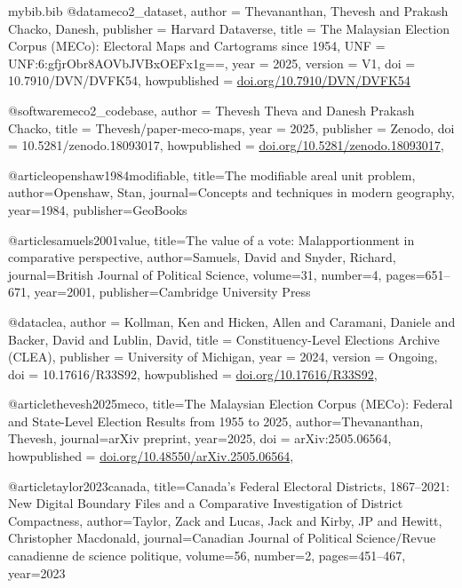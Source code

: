 \documentclass[11pt]{article}
\begin{document}
\begin{filecontents*}[overwrite]{mybib.bib}
	@data{meco2_dataset,
		author = {Thevananthan, Thevesh and Prakash Chacko, Danesh},
		publisher = {Harvard Dataverse},
		title = {{The Malaysian Election Corpus (MECo): Electoral Maps and Cartograms since 1954}},
		UNF = {UNF:6:gfjrObr8AOVbJVBxOEFx1g==},
		year = {2025},
		version = {V1},
		doi = {10.7910/DVN/DVFK54},
		howpublished = {\href{https://doi.org/10.7910/DVN/DVFK54}{doi.org/10.7910/DVN/DVFK54}}
	}

	@software{meco2_codebase,
		author       = {Thevesh Theva and Danesh Prakash Chacko},
		title        = {Thevesh/paper-meco-maps},
		year         = 2025,
		publisher    = {Zenodo},
		doi          = {10.5281/zenodo.18093017},
		howpublished = {\href{https://doi.org/10.5281/zenodo.18093017}{doi.org/10.5281/zenodo.18093017}},
	}

	@article{openshaw1984modifiable,
		title={The modifiable areal unit problem},
		author={Openshaw, Stan},
		journal={Concepts and techniques in modern geography},
		year={1984},
		publisher={GeoBooks}
	}

	@article{samuels2001value,
	title={The value of a vote: {Malapportionment} in comparative perspective},
	author={Samuels, David and Snyder, Richard},
	journal={British Journal of Political Science},
	volume={31},
	number={4},
	pages={651--671},
	year={2001},
	publisher={Cambridge University Press}
	}

	@data{clea,
		author       = {Kollman, Ken and Hicken, Allen and Caramani, Daniele and Backer, David and Lublin, David},
		title        = {{Constituency-Level Elections Archive (CLEA)}},
		publisher    = {University of Michigan},
		year         = {2024},
		version      = {Ongoing},
		doi          = {10.17616/R33S92},
		howpublished = {\href{https://doi.org/10.17616/R33S92}{doi.org/10.17616/R33S92}},
	}

	@article{thevesh2025meco,
		title={{The Malaysian Election Corpus (MECo)}: Federal and State-Level Election Results from 1955 to 2025},
		author={Thevananthan, Thevesh},
		journal={arXiv preprint},
		year={2025},
		doi = {arXiv:2505.06564},
		howpublished = {\href{https://doi.org/10.48550/arXiv.2505.06564}{doi.org/10.48550/arXiv.2505.06564}},
	}

	@article{taylor2023canada,
		title={{Canada's Federal Electoral Districts}, 1867--2021: New Digital Boundary Files and a Comparative Investigation of District Compactness},
		author={Taylor, Zack and Lucas, Jack and Kirby, JP and Hewitt, Christopher Macdonald},
		journal={Canadian Journal of Political Science/Revue canadienne de science politique},
		volume={56},
		number={2},
		pages={451--467},
		year={2023}
	}


\end{filecontents*}
\end{document}
